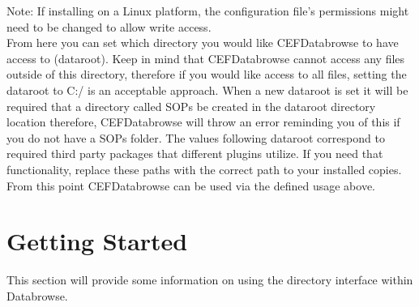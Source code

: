 \documentclass[10pt]{article}
\begin{document}
\noindent Note: If installing on a Linux platform, the configuration file's permissions might need to be changed to allow write access. \\

From here you can set which directory you would like CEFDatabrowse to have access to (dataroot). Keep in mind that CEFDatabrowse cannot access any files outside of this directory, therefore if you would like access to all files, setting the dataroot to C:/ is an acceptable approach. When a new dataroot is set it will be required that a directory called SOPs be created in the dataroot directory location therefore, CEFDatabrowse will throw an error reminding you of this if you do not have a SOPs folder. The values following dataroot correspond to required third party packages that different plugins utilize. If you need that functionality, replace these paths with the correct path to your installed copies. From this point CEFDatabrowse can be used via the defined usage above.

\clearpage
\section{Getting Started}\label{GettingStarted}

This section will provide some information on using the directory interface within Databrowse.
\end{document}
